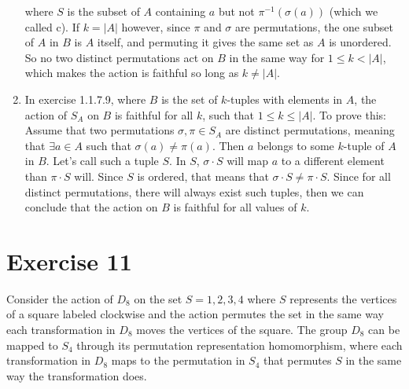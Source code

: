 \documentclass{article}
\begin{document}
\begin{enumerate}[label=\textbf{\alph*.}]
            where $S$ is the subset of $A$ containing $a$
            but not $\pi^{-1}(\sigma(a))$ (which we called c).
            If $k = |A|$ however, since $\pi$ and $\sigma$ are permutations,
            the one subset of $A$ in $B$ is $A$ itself,
            and permuting it gives the same set as $A$ is unordered.
            So no two distinct permutations act on $B$ in the same way
            for $1 \leqslant k < |A|$,
            which makes the action is faithful so long as $k \neq |A|$.
        \item
            In exercise 1.1.7.9,
            where $B$ is the set of $k$-tuples with elements in $A$,
            the action of $S_A$ on $B$ is faithful for all $k$,
            such that $1 \leqslant k \leqslant |A|$.
            To prove this: \\
            Assume that two permutations $\sigma, \pi \in S_A$
            are distinct permutations,
            meaning that $\exists a \in A$ such that $\sigma(a) \neq \pi(a)$.
            Then $a$ belongs to some $k$-tuple of $A$ in $B$.
            Let's call such a tuple $S$.
            In $S$, $\sigma \cdot S$ will map $a$ to a different element
            than $\pi \cdot S$ will.
            Since $S$ is ordered,
            that means that $\sigma \cdot S \neq \pi \cdot S$.
            Since for all distinct permutations, there will always exist
            such tuples,
            then we can conclude that the action on $B$ is faithful
            for all values of $k$.
    \end{enumerate}


    \section*{Exercise 11}
    Consider the action of $D_8$ on the set $S = {1, 2, 3, 4}$
    where $S$ represents the vertices of a square labeled clockwise
    and the action permutes the set in the same way each transformation
    in $D_8$ moves the vertices of the square.
    The group $D_8$ can be mapped to $S_4$ through its permutation
    representation homomorphism,
    where each transformation in $D_8$ maps to the permutation in $S_4$
    that permutes $S$ in the same way the transformation does. \\
\end{document}
